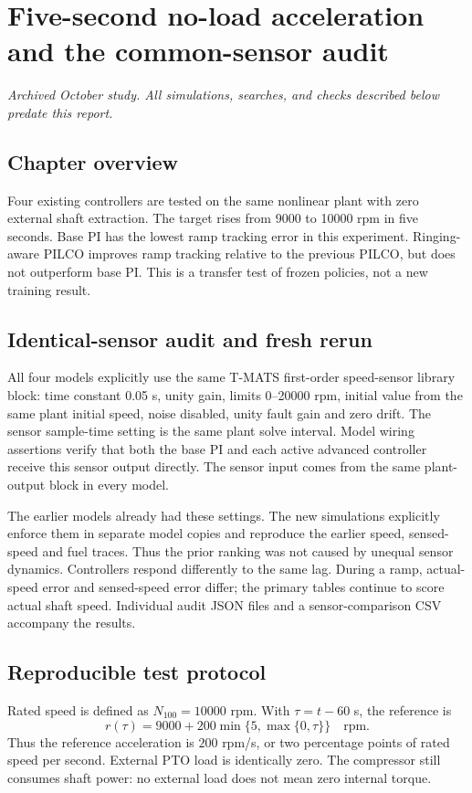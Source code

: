 \chapter{Five-second no-load acceleration and the common-sensor audit}
\textit{Archived October study. All simulations, searches, and checks described below predate this report.}\par

\section*{Chapter overview}Four existing controllers are tested on the same nonlinear plant with zero external shaft extraction. The target rises from 9000 to 10000 rpm in five seconds. Base PI has the lowest ramp tracking error in this experiment. Ringing-aware PILCO improves ramp tracking relative to the previous PILCO, but does not outperform base PI. This is a transfer test of frozen policies, not a new training result.
\section{Identical-sensor audit and fresh rerun}
All four models explicitly use the same T-MATS first-order speed-sensor library block: time constant 0.05 s, unity gain, limits 0--20000 rpm, initial value from the same plant initial speed, noise disabled, unity fault gain and zero drift. The sensor sample-time setting is the same plant solve interval. Model wiring assertions verify that both the base PI and each active advanced controller receive this sensor output directly. The sensor input comes from the same plant-output block in every model.

The earlier models already had these settings. The new simulations explicitly enforce them in separate model copies and reproduce the earlier speed, sensed-speed and fuel traces. Thus the prior ranking was not caused by unequal sensor dynamics. Controllers respond differently to the same lag. During a ramp, actual-speed error and sensed-speed error differ; the primary tables continue to score actual shaft speed. Individual audit JSON files and a sensor-comparison CSV accompany the results.
\section{Reproducible test protocol}
Rated speed is defined as $N_{100}=10000$ rpm. With $\tau=t-60$ s, the reference is
\begin{equation}r(\tau)=9000+200\min\{5,\max\{0,\tau\}\}\quad\text{rpm}.\end{equation}
Thus the reference acceleration is $200$ rpm/s, or two percentage points of rated speed per second. External PTO load is identically zero. The compressor still consumes shaft power: no external load does not mean zero internal torque.

